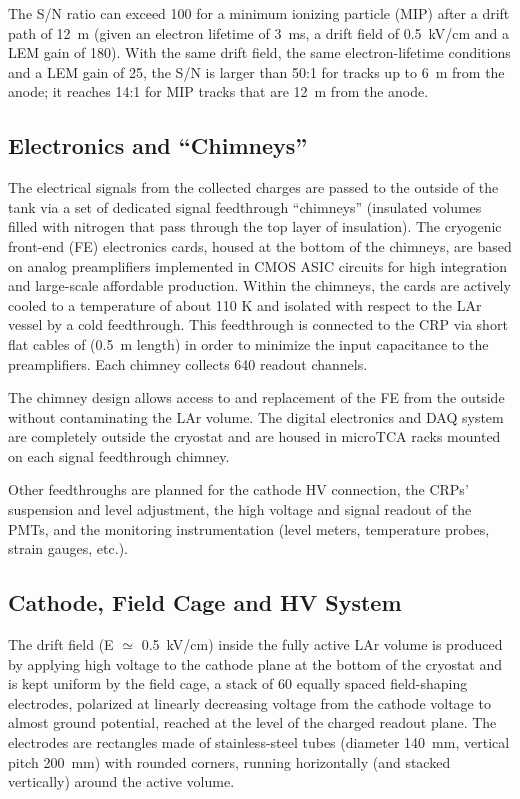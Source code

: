The S/N ratio can exceed 100 for a minimum
ionizing particle (MIP) after a drift path of 12~m (given an
electron lifetime of 3~ms, a drift field of 0.5~kV/cm and a LEM gain
of 180). With the same drift field, the same electron-lifetime conditions and a
LEM gain of 25, the S/N is larger than 50:1 for tracks up to 6~m from
the anode; it reaches 14:1 for MIP tracks that are 12~m from the
anode.


\subsection{Electronics and ``Chimneys''}
 
The electrical signals from the collected charges
are passed to the outside of the tank via a set of dedicated signal
feedthrough ``chimneys'' (insulated volumes filled with nitrogen
that pass through the top layer of insulation). 
The cryogenic front-end (FE) electronics cards, housed at the bottom of the
chimneys, are based on analog preamplifiers implemented in CMOS ASIC circuits for high integration and large-scale
affordable production. Within the chimneys, the cards are actively cooled to a temperature of about 110 K and
isolated with respect to the LAr vessel by a cold feedthrough.  This
feedthrough is connected to the CRP via short flat cables of (0.5~m length) in order to minimize the
input capacitance to the preamplifiers. Each chimney collects 640 readout channels.

The chimney design allows access to and replacement of the FE from the
outside without contaminating the LAr volume. The digital electronics
and DAQ system are completely outside the cryostat and are housed in
microTCA racks mounted on each signal feedthrough chimney. 

Other feedthroughs are planned for the cathode HV connection, the
CRPs' suspension and level adjustment, the high voltage and signal
readout of the PMTs, and the monitoring instrumentation (level meters,
temperature probes, strain gauges, etc.).

\subsection{Cathode, Field Cage and HV System}
\label{v4:fd-alt-ov:cathode}

The drift field (E ${\simeq}$ 0.5~kV/cm) inside the fully
active LAr volume is produced by applying high voltage to the cathode
plane at the bottom of the cryostat and is kept uniform by the field cage, a stack
of 60 equally spaced field-shaping electrodes,  
polarized at linearly decreasing voltage from the cathode 
voltage to almost ground potential, reached at the level of the charged readout plane.
The electrodes are rectangles made of stainless-steel tubes  (diameter 140~mm,  vertical pitch 200~mm)
with rounded corners, running horizontally (and stacked vertically) around the
active volume.


